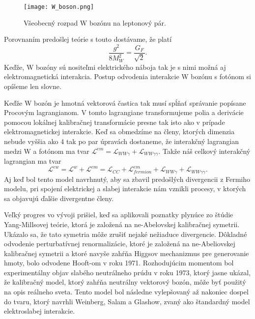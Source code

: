 \documentclass[../../main.tex]{subfiles}
\begin{document}
\begin{figure}[!h]
\centering
\texttt{[image: W\_boson.png]}
\caption{Všeobecný rozpad W bozónu na leptonový pár.}
\label{sf1:fig:W_boson}
\end{figure}
\newline
Porovnaním predošlej teórie s touto dostávame, že platí
\begin{equation}
\frac{g^2}{8M_W^2}=\frac{G_F}{\sqrt{2}}.
\end{equation}
Keďže, W bozóny sú nositeľmi elektrického náboja tak je s nimi možná aj elektromagnetická interakcia. Postup odvodenia interakcie W bozónu s fotónom si opíšeme len slovne.

Keďže W bozón je hmotná vektorová častica tak musí spĺňať správanie popísane Procovým lagrangianom. V tomto lagrangiane transformujeme polia a derivácie pomocou lokálnej kalibračnej transformácie presne tak isto ako v prípade elektromagnetickej interakcie. Keď sa obmedzíme na členy, ktorých dimenzia nebude vyššia ako 4 tak po par úpravách dostaneme, že interakčný lagrangian medzi W a fotónom ma tvar $\mathcal{L}^{em}=\mathcal{L}_{WW\gamma}+\mathcal{L}_{WW\gamma \gamma}$. Takže náš celkový interakčný lagrangian ma tvar
$$
\mathcal{L}^{ew}=\mathcal{L}^{w}+\mathcal{L}^{em} =\mathcal{L}_{CC}+\mathcal{L}^{em}_{fermion}+\mathcal{L}_{WW\gamma}+\mathcal{L}_{WW\gamma\gamma}.
$$
Aj keď bol tento model navrhnutý, aby sa zbavil predošlých divergencii z Fermiho modelu, pri spojení elektrickej a slabej interakcie nám vznikli procesy, v ktorých sa objavujú ďalšie divergentne členy.
 
Veľký progres vo vývoji prišiel, keď sa aplikovali poznatky plynúce zo štúdie Yang-Millsovej teórie, ktorá je založená na ne-Abelovskej kalibračnej symetrii. Ukázalo sa, že tato symetria môže zrušiť nejaké nežiaduce divergencie. Dôkladné odvodenie perturbatívnej renormalizácie, ktoré je založená na ne-Abeliovskej kalibračnej symetrii a ktoré navyše zahŕňa Higgsov mechanizmus pre generovanie hmoty, bolo odvodene Hooft-om v roku 1971. Rozhodujúcim momentom bol experimentálny objav slabého neutrálneho prúdu v roku 1973, ktorý jasne ukázal, že kalibračný model, ktorý zahŕňa neutrálny vektorový bozón, môže byť použitý na opis reálneho sveta. Tento model bol následne vylepšovaný až nakoniec dospel do tvaru, ktorý navrhli Weinberg, Salam a Glashow, zvaný ako štandardný model elektroslabej interakcie.
\end{document}

